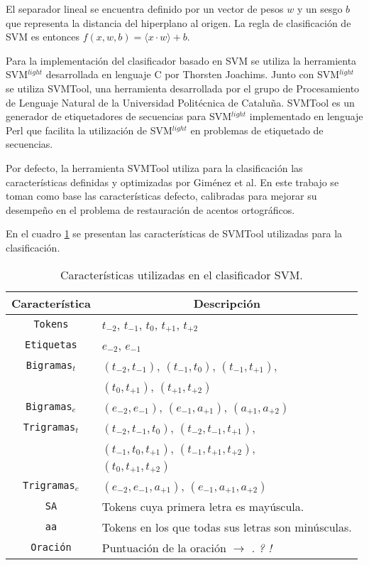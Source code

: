 \documentclass[runningheads,a4paper]{llncs}
\begin{document}
El separador lineal se encuentra definido por un vector de pesos $w$ y un sesgo $b$ que representa la distancia del hiperplano al origen. La regla de clasificación de SVM es entonces $f(x,w,b)=\langle x \cdot w \rangle+b$.

Para la implementaci\'on del clasificador basado en SVM se utiliza la herramienta SVM$^{light}$ desarrollada en lenguaje C por Thorsten Joachims\cite{JOACHIMS08}. Junto con SVM$^{light}$ se utiliza SVMTool, una herramienta desarrollada por el grupo de Procesamiento de Lenguaje Natural de la Universidad Politécnica de Cataluña\cite{GIMENEZ04}\cite{GIMENEZ06}. SVMTool es un generador de etiquetadores de secuencias para SVM$^{light}$ implementado en lenguaje Perl que facilita la utilizaci\'on de SVM$^{light}$ en problemas de etiquetado de secuencias. 

Por defecto, la herramienta SVMTool utiliza para la clasificación las características definidas y optimizadas por Giménez et al. En este trabajo se toman como base las caracter\'isticas defecto, calibradas para mejorar su desempeño en el problema de restauración de acentos ortográficos.

En el cuadro \ref{table:featuresSVM} se presentan las características de SVMTool utilizadas para la clasificación.

\begin{table}[ht]
 	\renewcommand{\arraystretch}{1.3}
	\renewcommand{\tabcolsep}{3pt}
	\caption{Características utilizadas en el clasificador SVM.}
	\label{table:featuresSVM}
	\centering
	\begin{tabular}{c l}
		\hline\hline
		\multicolumn{1}{c}{\textbf{Característica}} & \multicolumn{1}{c}{\textbf{Descripción}} \\
		\hline
		\texttt{Tokens} & $t_{-2}$, $t_{-1}$, $t_{0}$, $t_{+1}$, $t_{+2}$ \\
		\texttt{Etiquetas} &  $e_{-2}$, $e_{-1}$ \\
		\texttt{Bigramas$_{t}$} & $(t_{-2},t_{-1})$, $(t_{-1},t_{0})$, $(t_{-1},t_{+1})$, \\
			& $(t_{0},t_{+1})$, $(t_{+1},t_{+2})$ \\
		\texttt{Bigramas$_{e}$} & $(e_{-2},e_{-1})$, $(e_{-1},a_{+1})$, $(a_{+1},a_{+2})$ \\
		\texttt{Trigramas$_{t}$} & $(t_{-2},t_{-1},t_{0})$, $(t_{-2},t_{-1},t_{+1})$, \\
			& $(t_{-1},t_{0},t_{+1})$, $(t_{-1},t_{+1},t_{+2})$, \\
			& $(t_{0},t_{+1},t_{+2})$ \\
		\texttt{Trigramas$_{e}$} & $(e_{-2},e_{-1},a_{+1})$, $(e_{-1},a_{+1},a_{+2})$ \\
		\texttt{SA} & Tokens cuya primera letra es mayúscula. \\
		\texttt{aa} & Tokens en los que todas sus letras son minúsculas. \\
		\texttt{Oraci\'on} & Puntuación de la oración $\rightarrow$ \emph{.} \emph{?} \emph{!} \\
		\hline
	\end{tabular}
\end{table}
\end{document}
